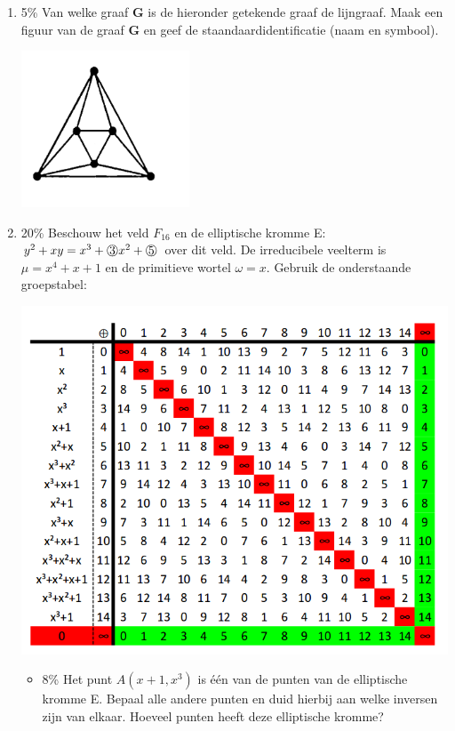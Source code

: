 \documentclass{article}
\def\note#1{\color{cyan} #1 \color{black}}
\def\circled#1{\raisebox{.5pt}{\textcircled{\raisebox{-.9pt} {#1}}}}
\begin{document}
\begin{enumerate}
\item {\note{5\%} Van welke graaf {\bf G} is de hieronder getekende graaf de lijngraaf. Maak een figuur van de graaf {\bf G} en geef de staandaardidentificatie (naam en symbool).
\begin{center}
    \includegraphics[width=5cm]{lijngraaf}
\end{center}
}
\newpage
\item {\note{20\%} Beschouw het veld $F_{16}$ en de elliptische kromme E: $y^2+xy = x^3 + \circled{3}x^2 + \circled{5} $ over dit veld. De irreducibele veelterm is $\mu = x^4 + x + 1$ en de primitieve wortel $\omega = x$. Gebruik de onderstaande groepstabel: 
\begin{center}
 \includegraphics[width=\linewidth]{groepstabel}
\end{center}


    \begin{itemize}
    \item {\note{8\%} Het punt $A(x + 1, x^3)$ is één van de punten van de elliptische kromme E. Bepaal alle andere punten en duid hierbij aan welke inversen zijn van elkaar. Hoeveel punten heeft deze elliptische kromme?
    
}
\end{itemize}}
\end{enumerate}
\end{document}
